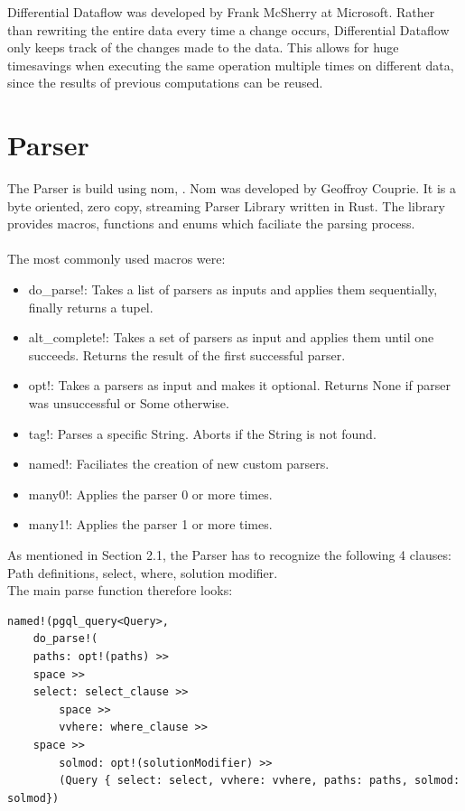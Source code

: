 \documentclass[11pt,singlecolumn]{scrartcl}
\begin{document}
Differential Dataflow was developed by Frank McSherry at Microsoft. \cite{Differential}
Rather than rewriting the entire data every time a change occurs, Differential Dataflow only keeps track of the changes made to the data. This allows for huge timesavings when executing the same operation multiple times on different data, since the results of previous computations can be reused.
\clearpage

\section{Parser}
The Parser is build using nom, \cite {Nom}. Nom was developed by Geoffroy Couprie. It is a byte oriented, zero copy, streaming Parser Library written in Rust. The library provides macros, functions and enums which faciliate the parsing process.\\\\
The most commonly used macros were:
\begin{itemize} 
\item do\_parse!: Takes a list of parsers as inputs and applies them sequentially, finally returns a tupel.
\item alt\_complete!: Takes a set of parsers as input and applies them until one succeeds. Returns the result of the first successful parser.
\item opt!: Takes a parsers as input and makes it optional. Returns None if parser was unsuccessful or Some otherwise.
\item tag!: Parses a specific String. Aborts if the String is not found.
\item named!: Faciliates the creation of new custom parsers.
\item many0!: Applies the parser 0 or more times.
\item many1!: Applies the parser 1 or more times. 
\end{itemize}

As mentioned in Section 2.1, the Parser has to recognize the following 4 clauses: Path definitions, select, where, solution modifier.
\\The main parse function therefore looks:
\begin{lstlisting}
named!(pgql_query<Query>,
    do_parse!(
	paths: opt!(paths) >>
	space >>
	select: select_clause >>
        space >>
        vvhere: where_clause >>
	space >>
        solmod: opt!(solutionModifier) >>
        (Query { select: select, vvhere: vvhere, paths: paths, solmod: solmod})
 \end{lstlisting} 
\clearpage
\end{document}
